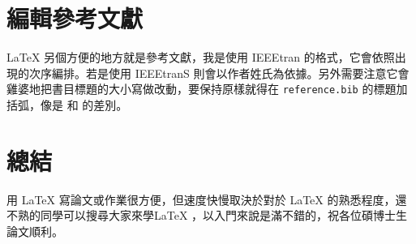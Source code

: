 
\section{編輯參考文獻}
\label{sec:ref}

LaTeX 另個方便的地方就是參考文獻，我是使用 IEEEtran 的格式，它會依照出現的次序編排。若是使用 IEEEtranS 則會以作者姓氏為依據。另外需要注意它會雞婆地把書目標題的大小寫做改動，要保持原樣就得在 \texttt{reference.bib} 的標題加括弧，像是 \cite{permissionevolution} 和 \cite{permissionevolution2} 的差別。


\section{總結}
\label{sec:summary}

用 LaTeX 寫論文或作業很方便，但速度快慢取決於對於 LaTeX 的熟悉程度，還不熟的同學可以搜尋大家來學LaTeX \cite{latex123}，以入門來說是滿不錯的，祝各位碩博士生論文順利。